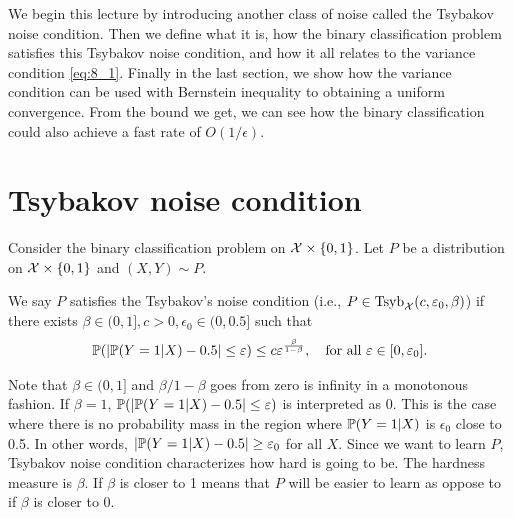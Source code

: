 \documentclass[twoside]{article}
\begin{document}
We begin this lecture by introducing another class of noise called the Tsybakov noise condition.  Then we define what it is, how the binary classification problem satisfies this Tsybakov noise condition, and how it all relates to the variance condition \cref{eq:8_1}.  Finally in the last section, we show how the variance condition can be used with Bernstein inequality to obtaining a uniform convergence.  From the bound we get, we can see how the binary classification could also achieve a fast rate of $O(1/\epsilon)$.   


\section{Tsybakov noise condition}
Consider the binary classification problem on $\mathcal{X} \times \{0,1\}$.  Let $P$ be a distribution on $\mathcal{X} \times \{0, 1\}$ and $(X,Y) \sim P$. 

\newcommand{\Tsyb}{\mathrm{Tsyb}}
\begin{definition}
    We say $P$ satisfies the Tsybakov's noise condition (i.e., $P \in \Tsyb_{\cX}(c, \epsilon_0,\beta)$) if there exists $\beta \in (0,1], c > 0, \epsilon_0 \in (0, 0.5]$ such that 
    \begin{align}
        \mathbb{P}(| \mathbb{P}(Y=1 | X) - 0.5 | \leq \varepsilon ) \leq c \varepsilon^{\frac{\beta}{1-\beta}}, \quad \text{for all } \varepsilon \in [0, \varepsilon_0].
    \end{align}
\end{definition}
Note that $\beta \in (0, 1]$ and $\beta/1-\beta$ goes from zero is infinity in a monotonous fashion.  If $\beta = 1$, $\mathbb{P}(| \mathbb{P}(Y=1 | X) - 0.5 | \leq \varepsilon )$ is interpreted as $0$.  This is the case where there is no probability mass in the region where $\mathbb{P}(Y=1 |X)$ is $\epsilon_0$ close to 0.5.  In other words, $|\mathbb{P}(Y=1 | X) - 0.5 | \geq \varepsilon_0$ for all $X$.  Since we want to learn $P$, Tsybakov noise condition characterizes how hard is going to be.  The hardness measure is $\beta$.  If $\beta$ is closer to 1 means that $P$ will be easier to learn as oppose to if $\beta$ is closer to 0.
\end{document}
